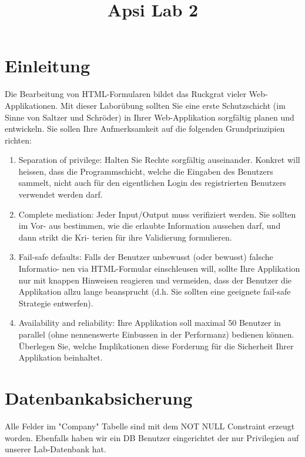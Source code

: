 \documentclass[10pt]{scrartcl}
\title{ %
Apsi
\vspace{0.2cm}
\Large Lab 2 }
\begin{document}
 \maketitle
 \thispagestyle{firststyle}
 \pagestyle{firststyle}
 \begin{abstract}
 \begin{center}

 \end{center}
 \vspace{0.5cm}
\hrulefill
\end{abstract}

 \pagestyle{documentstyle}
 \tableofcontents
 \pagebreak
 \section{Einleitung}
 Die Bearbeitung von HTML-Formularen bildet das Ruckgrat vieler Web-Applikationen. Mit dieser Laborübung sollten Sie 
eine erste Schutzschicht (im Sinne von Saltzer und Schröder) in Ihrer Web-Applikation sorgfältig planen und entwickeln.
Sie sollen Ihre Aufmerksamkeit auf die folgenden Grundprinzipien richten:
\begin{enumerate}
 \item  Separation of privilege: Halten Sie Rechte sorgfältig auseinander. Konkret will heissen,
dass die Programmschicht, welche die Eingaben des Benutzers sammelt, nicht auch für
den eigentlichen Login des registrierten Benutzers verwendet werden darf.
 \item  Complete mediation: Jeder Input/Output muss verifiziert werden. Sie sollten im Vor-
aus bestimmen, wie die erlaubte Information aussehen darf, und dann strikt die Kri-
terien für ihre Validierung formulieren.
 \item  Fail-safe defaults: Falls der Benutzer unbewusst (oder bewusst) falsche Informatio-
nen via HTML-Formular einschleusen will, sollte Ihre Applikation nur mit knappen
Hinweisen reagieren und vermeiden, dass der Benutzer die Applikation allzu lange
beansprucht (d.h. Sie sollten eine geeignete fail-safe Strategie entwerfen).
 \item  Availability and reliability: Ihre Applikation soll maximal 50 Benutzer in parallel (ohne
nennenswerte Einbussen in der Performanz) bedienen können. Überlegen Sie, welche
Implikationen diese Forderung für die Sicherheit Ihrer Applikation beinhaltet.
\end{enumerate}
\section{Datenbankabsicherung}
Alle Felder im "Company" Tabelle sind mit dem NOT NULL Constraint erzeugt worden. Ebenfalls haben wir ein DB Benutzer eingerichtet der nur Privilegien auf unserer Lab-Datenbank hat.
 
\end{document}
